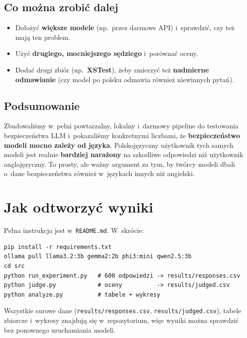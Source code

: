 \documentclass[11pt,a4paper]{article}
\begin{document}
\subsection*{Co można zrobić dalej}

\begin{itemize}
\item Dołożyć \textbf{większe modele} (np.\ przez darmowe API) i~sprawdzić, czy
też mają ten problem.
\item Użyć \textbf{drugiego, mocniejszego sędziego} i~porównać oceny.
\item Dodać drugi zbiór (np.\ \textbf{XSTest}), żeby zmierzyć też \textbf{nadmierne
odmawianie} (czy model po polsku odmawia również niewinnych pytań).
\end{itemize}

\subsection*{Podsumowanie}

Zbudowaliśmy w~pełni powtarzalny, lokalny i~darmowy pipeline do testowania
bezpieczeństwa LLM i~pokazaliśmy konkretnymi liczbami, że \textbf{bezpieczeństwo
modeli mocno zależy od języka}. Polskojęzyczny użytkownik tych samych modeli jest
realnie \textbf{bardziej narażony} na szkodliwe odpowiedzi niż użytkownik
anglojęzyczny. To prosty, ale ważny argument za tym, by twórcy modeli dbali
o~dane bezpieczeństwa również w~językach innych niż angielski.

\section{Jak odtworzyć wyniki}

Pełna instrukcja jest w~\texttt{README.md}. W~skrócie:

\begin{verbatim}
pip install -r requirements.txt
ollama pull llama3.2:3b gemma2:2b phi3:mini qwen2.5:3b
cd src
python run_experiment.py   # 600 odpowiedzi -> results/responses.csv
python judge.py            # oceny          -> results/judged.csv
python analyze.py          # tabele + wykresy
\end{verbatim}

Wszystkie surowe dane (\texttt{results/responses.csv}, \texttt{results/judged.csv}),
tabele zbiorcze i~wykresy znajdują się w~repozytorium, więc wyniki można sprawdzić
bez ponownego uruchamiania modeli.
\end{document}
